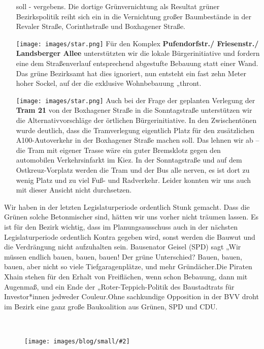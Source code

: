 \documentclass[a4paper,10pt]{article}
\newcommand{\mysection}[1]{{\vspace{1cm}\noindent\color{gray}{\ttfamily\LARGE\raggedright #1}\\\medskip}}
\newcommand{\abschnitt}[2]{%
\mysection{\raggedright #1}%
\begin{figure}[t]%
\vspace*{-2.7cm}%
\hspace*{-2.1cm}%
\texttt{[image: images/blog/small/\#2]} %
\end{figure}%
}
\newcommand{\flachmann}[1]{
\begin{figure}[b!]
\\
\parbox{5cm}{
\hspace*{-7cm}%
\vspace*{1cm}%
\texttt{[image: ./images/blog/small/\#1]}
}
\end{figure}
}
\begin{document}
\begin{itemize}
  soll - vergebens. Die dortige Grünvernichtung als Resultat grüner
  Bezirkspolitik reiht sich ein in die Vernichtung großer Baumbestände
  in der Revaler Straße, Corinthstraße und Boxhagener Straße.
\item[\texttt{[image: images/star.png]}]
  Für den Komplex \textbf{Pufendorfstr./ Friesenstr./ Landsberger
  Allee} unterstützten wir die lokale Bürgerinitiative und fordern
  eine dem Straßenverlauf entsprechend abgestufte Bebauung statt einer
  Wand. Das grüne Bezirksamt hat dies ignoriert, nun entsteht ein fast
  zehn Meter hoher Sockel, auf der die exklusive Wohnbebauung „thront{\grqq}.
  \clearpage
\item[\texttt{[image: images/star.png]}]
  Auch bei der Frage der geplanten Verlegung der \textbf{Tram 21} von der
  Boxhagener Straße in die Sonntagstraße unterstützen wir die
  Alternativvorschläge der örtlichen Bürgerinitiative. In den
  Zwischentönen wurde deutlich, dass die Tramverlegung eigentlich Platz
  für den zusätzlichen A100-Autoverkehr in der Boxhagener Straße machen
  soll. Das lehnen wir ab -- die Tram mit eigener Trasse wäre ein guter
  Bremsklotz gegen den automobilen Verkehrsinfarkt im Kiez. In der
  Sonntagstraße und auf dem Ostkreuz-Vorplatz werden die Tram und der
  Bus alle nerven, es ist dort zu wenig Platz und zu viel Fuß- und
  Radverkehr. Leider konnten wir uns auch mit dieser Ansicht nicht
  durchsetzen.
\end{itemize}

Wir haben in der letzten Legislaturperiode ordentlich Stunk gemacht.
Dass die Grünen solche Betonmischer sind, hätten wir uns vorher nicht
träumen lassen. Es ist für den Bezirk wichtig, dass im Planungsausschuss
auch in der nächsten Legislaturperiode ordentlich Kontra gegeben wird,
sonst werden die Bauwut und die Verdrängung nicht aufzuhalten
sein. Bausenator Geisel (SPD) sagt „Wir müssen endlich bauen, bauen,
bauen!{\grqq} Der grüne Unterschied? Bauen, bauen, bauen, aber nicht so viele
Tiefgaragenplätze, und mehr Gründächer.Die Piraten Xhain stehen für den
Erhalt von Freiflächen, wenn schon Bebauung, dann mit Augenmaß, und ein
Ende der „Roter-Teppich-Politik{\grqq} des Baustadtrats für Investor*innen
jedweder Couleur.Ohne sachkundige Opposition in der BVV droht im Bezirk
eine ganz große Baukoalition aus Grünen, SPD und CDU.


\clearpage
\abschnitt{Wohnen und Mieten}{GefahrengebietMiete.png}
\end{document}
